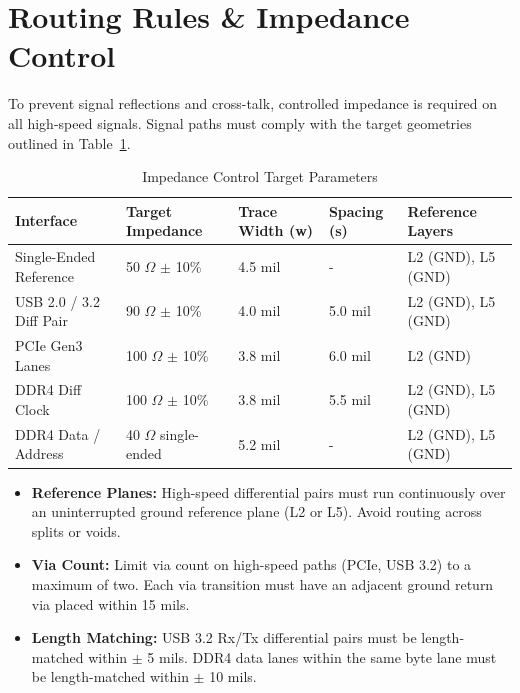 \section{Routing Rules \& Impedance Control}
To prevent signal reflections and cross-talk, controlled impedance is required on all high-speed signals. Signal paths must comply with the target geometries outlined in Table~\ref{tab:impedance}.

\begin{table}[h]
\centering
\fontsize{9}{11}\selectfont
\begin{tabularx}{\textwidth}{l l l l X}
\rowcolor{primary}
\color{white}\textbf{Interface} & \color{white}\textbf{Target Impedance} & \color{white}\textbf{Trace Width (w)} & \color{white}\textbf{Spacing (s)} & \color{white}\textbf{Reference Layers} \\
\midrule
Single-Ended Reference & 50 $\Omega$ $\pm$ 10\% & 4.5 mil & - & L2 (GND), L5 (GND) \\
\rowcolor{lightbg}
USB 2.0 / 3.2 Diff Pair & 90 $\Omega$ $\pm$ 10\% & 4.0 mil & 5.0 mil & L2 (GND), L5 (GND) \\
PCIe Gen3 Lanes & 100 $\Omega$ $\pm$ 10\% & 3.8 mil & 6.0 mil & L2 (GND) \\
\rowcolor{lightbg}
DDR4 Diff Clock & 100 $\Omega$ $\pm$ 10\% & 3.8 mil & 5.5 mil & L2 (GND), L5 (GND) \\
DDR4 Data / Address & 40 $\Omega$ single-ended & 5.2 mil & - & L2 (GND), L5 (GND) \\
\bottomrule
\end{tabularx}
\caption{Impedance Control Target Parameters}
\label{tab:impedance}
\end{table}

\begin{tcolorbox}[colback=lightbg, colframe=secondary, title=\textbf{\faInfoCircle\ High-Speed Routing Best Practices}]
\fontsize{9}{11}\selectfont
\begin{itemize}[leftmargin=*]
    \item \textbf{Reference Planes:} High-speed differential pairs must run continuously over an uninterrupted ground reference plane (L2 or L5). Avoid routing across splits or voids.
    \item \textbf{Via Count:} Limit via count on high-speed paths (PCIe, USB 3.2) to a maximum of two. Each via transition must have an adjacent ground return via placed within 15 mils.
    \item \textbf{Length Matching:} USB 3.2 Rx/Tx differential pairs must be length-matched within $\pm$ 5 mils. DDR4 data lanes within the same byte lane must be length-matched within $\pm$ 10 mils.
\end{itemize}
\end{tcolorbox}

